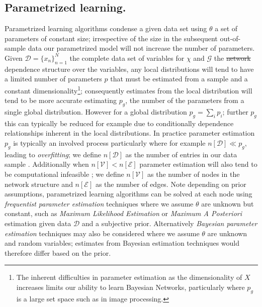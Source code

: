 \documentclass[7pt]{article}
\begin{document}
\subsection{Parametrized learning.}
Parametrized learning algorithms condense a given data set using $\theta$ a set of parameters of constant size; irrespective of the size in the subsequent out-of-sample data our parametrized model will not increase the number of parameters.  Given $\mathcal{D} = \{x_n \}_{n=1}^N$  the complete data set of variables for $\mathcal{\chi}$ and $\mathcal{G}$ the \st{network} dependence structure over the variables, any local distributions will tend to have a limited number of parameters $p$ that must be estimated from a sample and a constant dimensionality\footnote{The inherent difficulties in parameter estimation as the dimensionality of $X$ increases limits our ability to learn Bayesian Networks, particularly where $p_g$ is a large set space such as in image processing.}; consequently estimates from the local distribution will  tend to be more accurate estimating $p_g$, the number of the parameters from a single global distribution. However for a global distribution $p_g= \sum_{i} p_i $; further $p_g$  this can typically be reduced for example due to conditionally dependence relationships inherent in the local distributions. In practice parameter estimation $p_g$  is typically an involved process particularly where for example  $n[\mathcal{D}] \ll p_g$, leading to \emph{overfitting};  we define  $n[\mathcal{D}]$  as the number of entries in our data sample \cite{castelo2006robust, schafer2005learning, hastie2009elements}. Additionally when $n[\mathcal{V}]< n[\mathcal{E}]$  parameter estimation will also tend to be computational infeasible \cite{korb2010bayesian, koller2009probabilistic};  we define $n[\mathcal{V}]$ as the number of nodes in the network structure and $n[\mathcal{E}]$ as the number of edges. Note depending on prior assumptions, parametrized learning algorithms can be solved at each node using \emph{frequentist parameter estimation} techniques where we assume $\theta$ are unknown but constant, such as \emph{Maximum Likelihood Estimation} or \emph{Maximum A Posteriori} estimation given data $\mathcal{D}$ and a subjective prior. Alternatively \emph{Bayesian parameter estimation} techniques may also be considered where we assume $\theta$ are unknown and random variables; estimates from Bayesian estimation techniques would therefore differ based on the prior.
\end{document}
